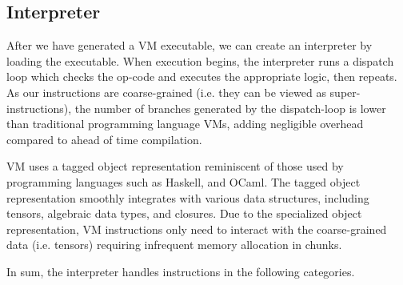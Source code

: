 \subsection{Interpreter}

After we have generated a VM executable,
we can create an interpreter by loading the executable. When execution begins, the interpreter runs a dispatch loop which checks the op-code and executes the appropriate logic, then repeats. As our instructions are coarse-grained (i.e. they can be viewed as super-instructions), the number of branches generated by the dispatch-loop is lower than traditional programming language VMs, adding negligible overhead compared to ahead of time compilation.

VM uses a tagged object representation reminiscent of those used by programming languages such as Haskell, and OCaml. The tagged object representation smoothly integrates with various data structures, including tensors, algebraic data types, and closures. Due to the specialized object representation, VM instructions only need to interact with the coarse-grained data (i.e. tensors) requiring infrequent memory allocation in chunks.

In sum, the interpreter handles instructions in the following categories.

